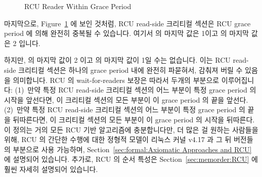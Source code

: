 \begin{figure}[tb]
\centering
{}
\caption{RCU Reader Within Grace Period}
\label{fig:defer:RCU Reader Within Grace Period}
\end{figure}

마지막으로,
Figure~\ref{fig:defer:RCU Reader Within Grace Period} 에 보인 것처럼, RCU
read-side 크리티컬 섹션은 RCU grace period 에 의해 완전히 중복될 수 있습니다.
여기서  의 마지막 값은 1이고  의 마지막 값은 2 입니다.

하지만,  의 마지막 값이 2 이고  의 마지막 값이 1일 수는 없습니다.
이는 RCU read-side 크리티컬 섹션은 하나의 grace period 내에 완전히 파묻혀서,
감춰져 버릴 수 있음을 의미합니다.
RCU 의 wait-for-readers 보장은 따라서 두개의 부분으로 이루어집니다:
(1)~만약 특정 RCU read-side 크리티컬 섹션의 어느 부분이 특정 grace period 의
시작을 앞선다면, 이 크리티컬 섹션의 모든 부분이 이 grace period 의 끝을 앞선다.
(2)~만약 특정 RCU read-side 크리티컬 섹션의 어느 부분이 특정 grace period 의
끝을 뒤따른다면, 이 크리티컬 섹션의 모든 부분이 이 grace period 의 시작을
뒤따른다.
이 정의는 거의 모든 RCU 기반 알고리즘에 충분합니다만, 더 많은 걸 원하는
사람들을 위해, RCU 의 간단한 수행에 대한 정형적 모델이 리눅스 커널 v4.17 과 그
뒤 버전들의 부분으로 사용 가능하며,
Section~\ref{sec:formal:Axiomatic Approaches and RCU} 에 설명되어 있습니다.
추가로, RCU 의 순서 특성은 Section~\ref{sec:memorder:RCU} 에 훨씬 자세히
설명되어 있습니다.
\iffalse

